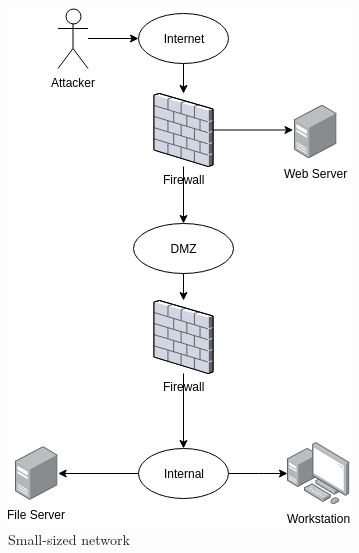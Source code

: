 \begin{figure}
    \centering
    \begin{subfigure}[t]{0.3\textwidth}
        \includegraphics[width=\linewidth]{resource/img/ch_automation/from_ares_paper/net_small.png} 
        \caption{Small-sized network\cite{Ou_Appel_2005}} 
        \label{fig:refnet_small}
    \end{subfigure}
          \begin{subfigure}[t]{0.33\textwidth}
        \centering

\end{subfigure}
\end{figure}
